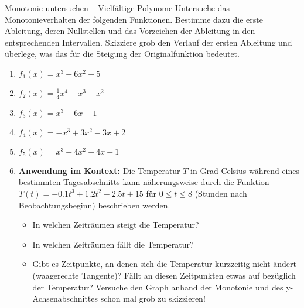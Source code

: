 \begin{aufgabenumgebung}{Monotonie untersuchen – Vielfältige Polynome}
Untersuche das Monotonieverhalten der folgenden Funktionen. Bestimme dazu die erste Ableitung, deren Nullstellen und das Vorzeichen der Ableitung in den entsprechenden Intervallen. Skizziere grob den Verlauf der ersten Ableitung und überlege, was das für die Steigung der Originalfunktion bedeutet.
\begin{enumerate}
    \item $f_1(x) = x^3 - 6x^2 + 5$ 

    \item $f_2(x) = \frac{1}{4}x^4 - x^3 + x^2$

    \item $f_3(x) = x^3 + 6x - 1$

    \item $f_4(x) = -x^3 + 3x^2 - 3x + 2$

    \item $f_5(x) = x^3 - 4x^2 + 4x - 1$

    \item \textbf{Anwendung im Kontext:} Die Temperatur $T$ in Grad Celsius während eines bestimmten Tagesabschnitts kann näherungsweise durch die Funktion $T(t) = -0.1t^3 + 1.2t^2 - 2.5t + 15$ für $0 \le t \le 8$ (Stunden nach Beobachtungsbeginn) beschrieben werden. 
        \begin{itemize}
            \item In welchen Zeiträumen steigt die Temperatur?
            \item In welchen Zeiträumen fällt die Temperatur?
            \item Gibt es Zeitpunkte, an denen sich die Temperatur kurzzeitig nicht ändert (waagerechte Tangente)? Fällt an diesen Zeitpunkten etwas auf bezüglich der Temperatur? Versuche den Graph anhand der Monotonie und des y-Achsenabschnittes schon mal grob zu skizzieren! 
        \end{itemize}
\end{enumerate}
\end{aufgabenumgebung}


